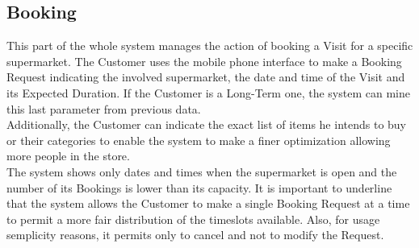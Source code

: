 \subsection{Booking}

This part of the whole system manages the action of booking a Visit for a specific supermarket. The Customer uses the mobile phone interface to make a Booking Request indicating the involved supermarket, the date and time of the Visit and its Expected Duration. If the Customer is a Long-Term one, the system can mine this last parameter from previous data.\\
Additionally, the Customer can indicate the exact list of items he intends to buy or their categories to enable the system to make a finer optimization allowing more people in the store.\\
The system shows only dates and times when the supermarket is open and the number of its Bookings is lower than its capacity.
It is important to underline that the system allows the Customer to make a single Booking Request at a time to permit a more fair distribution of the timeslots available. Also, for usage semplicity reasons, it permits only to cancel and not to modify the Request.